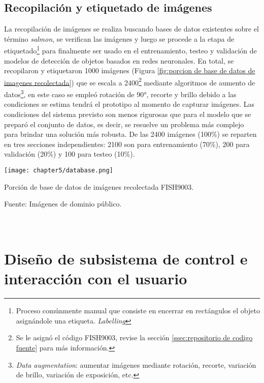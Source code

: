 \section{Recopilación y etiquetado de imágenes}

La recopilación de imágenes se realiza buscando bases de datos existentes sobre el término \textit{salmon}, se verifican las imágenes y luego se procede a la etapa de etiquetado\footnote{Proceso comúnmente manual que consiste en encerrar en rectángulos el objeto asignándole una etiqueta. \textit{Labelling}} para finalmente ser usado en el entrenamiento, testeo y validación de modelos de detección de objetos basados en redes neuronales. En total, se recopilaron y etiquetaron 1000 imágenes (Figura \ref{fig:porcion de base de datos de imagenes recolectada}) que se escala a 2400\footnote{Se le asignó el código FISH9003, revise la sección \ref{ssec:repositorio de codigo fuente} para más información.} mediante algoritmos de aumento de datos\footnote{\textit{Data augmentation}: aumentar imágenes mediante rotación, recorte, variación de brillo, variación de exposición, etc.}, en este caso se empleó rotación de 90°, recorte y brillo debido a las condiciones se estima tendrá el prototipo al momento de capturar imágenes. Las condiciones del sistema previsto son menos rigurosas que para el modelo que se preparó el conjunto de datos, es decir, se resuelve un problema más complejo para brindar una solución más robusta. De las 2400 imágenes (100\%) se reparten en tres secciones independientes: 2100 son para entrenamiento (70\%), 200 para validación (20\%) y 100 para testeo (10\%). 

\begin{myfigure}[H]
	\footnotesize\centering
	\texttt{[image: chapter5/database.png]}
	\caption{Porción de base de datos de imágenes recolectada FISH9003.}
	\begin{myflushcenter}
		Fuente: Imágenes de dominio público.
	\end{myflushcenter}
	\label{fig:porcion de base de datos de imagenes recolectada}
\end{myfigure}

\pagestyle{myportland}
\doublespacing
\chapter[\quad\quad\quad\quad ----- Diseño de subsistema de control e interacción con el usuario]{\\ Diseño de subsistema de control e interacción con el usuario}
\thispagestyle{myportland}
\label{ssec:diseno de subsistema de control e interaccion con el usuario}


